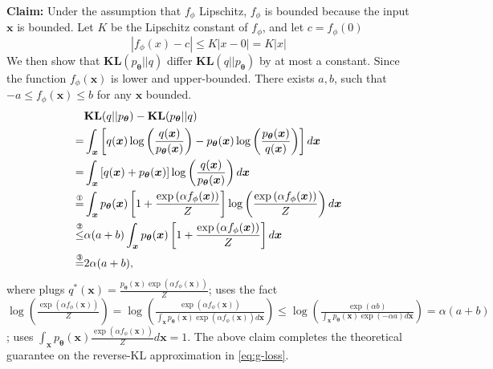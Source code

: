 \documentclass{article}
\newcommand{\led}[1]{\overset{\text{\ding{#1}}}{\leq}}
\newcommand{\lee}[1]{\overset{\text{\ding{#1}}}{=}}
\newcommand{\kl}{\textbf{KL}}
\newcommand{\0}{\bm{0}}
\newcommand{\wm}{\bm{\theta}}
\newcommand{\xm}{\bm{x}}
\begin{document}
\textbf{Claim:} Under the assumption that $f_\phi$ Lipschitz, $f_\phi$ is bounded because the input $\xm$ is bounded. Let $K$ be the Lipschitz constant of $f_\phi$, and let $c = f_\phi(0)$
\begin{equation}
    |f_\phi(x)-c|\leq K|x-0| = K|x|
\end{equation}
We then show that $\kl(p_{\wm} || q )$ differ $\kl(q || p_{\wm})$ by at most a constant. Since the function $f_{\phi}(\xm)$ is lower and upper-bounded. There exists $a,b$, such that $-a \leq f_{\phi}(\xm) \leq b$ for any $\xm$ bounded.
\begin{equation}\label{asfsafvsgvsdf}
\begin{split}
 & \kl(q || p_{\wm}) - \kl(p_{\wm} || q )  \\
= & \int_{\xm} \left[ q(\xm) \log\left(\frac{q(\xm)}{p_{\wm}(\xm)}\right)- p_{\wm}(\xm) \log\left(\frac{p_{\wm}(\xm)}{q(\xm)}\right) \right] d \xm\\
= & \int_{\xm} \left[ q(\xm) +p_{\wm}(\xm) \right] \log\left(\frac{q(\xm)}{p_{\wm}(\xm)}\right)  d \xm\\
\lee{172} & \int_{\xm}p_{\wm}(\xm)  \left[ 1 +  \frac{\exp{(\alpha f_{\phi}(\xm))}}{Z} \right] \log\left( \frac{\exp{(\alpha f_{\phi}(\xm))}}{Z}\right)  d \xm\\
\led{173} & \alpha(a+b) \int_{\xm}p_{\wm}(\xm)  \left[ 1 +  \frac{\exp{(\alpha f_{\phi}(\xm))}}{Z} \right]    d \xm\\
\lee{174} & 2\alpha(a+b),\\
\end{split}
\end{equation}
where  plugs $q^*(\xm) = \frac{p_{\wm}(\xm)\exp{(\alpha f_{\phi}(\xm))}}{Z}$;  uses the fact $\log\left( \frac{\exp{(\alpha f_{\phi}(\xm))}}{Z}\right) = \log\left( \frac{\exp{(\alpha f_{\phi}(\xm))}}{\int_{\xm} p_{\wm}(\xm)\exp{(\alpha f_{\phi}(\xm))} d \xm }\right) \leq \log\left( \frac{\exp{(\alpha b)}}{\int_{\xm} p_{\wm}(\xm)\exp{(-\alpha a)} d \xm }\right)= \alpha(a+b)$;  uses $\int_{\xm}p_{\wm}(\xm)     \frac{\exp{(\alpha f_{\phi}(\xm))}}{Z} d \xm=1$.
The above claim completes the theoretical guarantee on the reverse-KL approximation in \eqref{eq:g-loss}.
\end{document}
